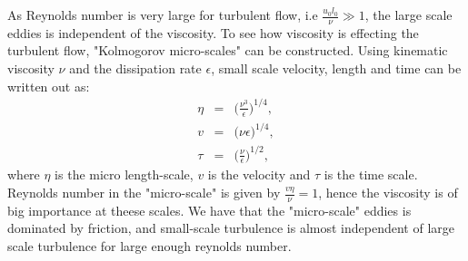 \documentclass[a4paper, 12pt]{report}
\begin{document}
As Reynolds number is very large for turbulent flow, i.e $\frac{u_0l_0}{\nu} \gg 1$, the large scale eddies is independent of the viscosity. To see how viscosity is effecting the turbulent flow, "Kolmogorov micro-scales" can be constructed. Using kinematic viscosity $\nu$ and the dissipation rate $\epsilon$, small scale velocity, length and time can be written out as:
\begin{eqnarray}
\label{eqn:microLength}
\eta &=& \big(\frac{\nu^3}{\epsilon}\big)^{1/4}, \\
\label{eqn:microVelocity}
v &=& \big(\nu\epsilon\big)^{1/4}, \\
\label{eqn:microTime}
\tau &=& \big(\frac{\nu}{\epsilon}\big)^{1/2}, 
\end{eqnarray}  
where  $\eta$ is the micro length-scale, $v$ is the velocity and $\tau$ is the time scale. Reynolds number in the "micro-scale" is given by $\frac{v\eta}{\nu} = 1$, hence the viscosity is of big importance at theese scales. We have that the "micro-scale" eddies is dominated by friction, and small-scale turbulence is almost independent of large scale turbulence for large enough reynolds number.
\end{document}
